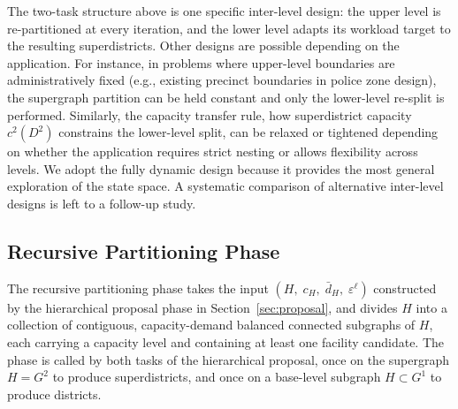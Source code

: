 \documentclass[preprint,12pt,authoryear]{elsarticle}
\theoremstyle{definition}
\begin{document}
The two-task structure above is one specific inter-level design: the upper
level is re-partitioned at every iteration, and the lower level adapts its
workload target to the resulting superdistricts.  Other designs are possible
depending on the application.  For instance, in problems where upper-level
boundaries are administratively fixed (e.g., existing precinct boundaries in
police zone design), the supergraph partition can be held constant and only the
lower-level re-split is performed.  Similarly, the capacity transfer rule,
how superdistrict capacity $c^2(D^2)$ constrains the lower-level split,
can be relaxed or tightened depending on whether the application requires
strict nesting or allows flexibility across levels.  We adopt the fully dynamic design because it provides the most general exploration of the state space. A systematic comparison of alternative inter-level designs is left to a follow-up study.

\subsection{Recursive Partitioning Phase}
\label{sec:recursive}

The recursive partitioning phase takes the input $(H,\; c_H,\; \bar{d}_H,\; \varepsilon^{\ell})$ constructed by the hierarchical proposal phase in Section~\ref{sec:proposal}, and divides $H$ into a collection of contiguous, capacity-demand balanced connected subgraphs of $H$, each carrying a capacity level and containing at least one facility candidate. The phase is called by both tasks of the hierarchical proposal, once on the supergraph $H=G^2$ to produce superdistricts, and once on a base-level subgraph $H \subset G^1$ to produce districts.
\end{document}
